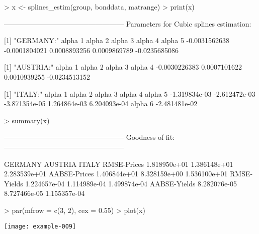 \begin{Schunk}
\begin{Sinput}
> x <- splines_estim(group, bonddata, matrange)
> print(x)
\end{Sinput}
\begin{Soutput}
---------------------------------------------------
Parameters for Cubic splines estimation:

[1] "GERMANY:"
      alpha 1       alpha 2       alpha 3       alpha 4       alpha 5 
-0.0031562638 -0.0001804021  0.0008893256  0.0009869789 -0.0235685086 

[1] "AUSTRIA:"
      alpha 1       alpha 2       alpha 3       alpha 4 
-0.0030226383  0.0007101622  0.0010939255 -0.0234513152 

[1] "ITALY:"
      alpha 1       alpha 2       alpha 3       alpha 4       alpha 5 
-1.319834e-03 -2.612472e-03 -3.871354e-05  1.264864e-03  6.204093e-04 
      alpha 6 
-2.481481e-02 
\end{Soutput}
\end{Schunk}


\begin{Schunk}
\begin{Sinput}
> summary(x)
\end{Sinput}
\begin{Soutput}
---------------------------------------------------
Goodness of fit:
---------------------------------------------------

                  GERMANY      AUSTRIA        ITALY
RMSE-Prices  1.818950e+01 1.386148e+01 2.283539e+01
AABSE-Prices 1.406844e+01 8.328159e+00 1.536100e+01
RMSE-Yields  1.224657e-04 1.114989e-04 1.499874e-04
AABSE-Yields 8.282076e-05 8.727466e-05 1.155357e-04
\end{Soutput}
\end{Schunk}

\begin{center}
\begin{Schunk}
\begin{Sinput}
> par(mfrow = c(3, 2), cex = 0.55)
> plot(x)
\end{Sinput}
\end{Schunk}
\texttt{[image: example-009]}
\end{center}

